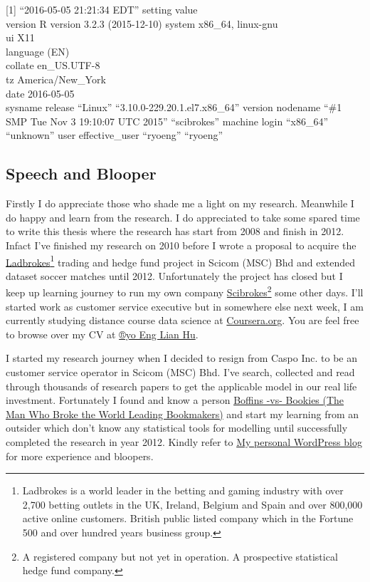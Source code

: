 \documentclass[article]{jss}
\begin{document}
{[}1{]} ``2016-05-05 21:21:34 EDT'' setting value\\
 version R version 3.2.3 (2015-12-10) system x86\_64, linux-gnu\\
 ui X11\\
 language (EN)\\
 collate en\_US.UTF-8\\
 tz America/New\_York\\
 date 2016-05-05\\
 sysname release ``Linux'' ``3.10.0-229.20.1.el7.x86\_64'' version
nodename ``\#1 SMP Tue Nov 3 19:10:07 UTC 2015'' ``scibrokes'' machine
login ``x86\_64'' ``unknown'' user effective\_user ``ryoeng'' ``ryoeng''

\subsection{Speech and Blooper}\label{speech-and-blooper}

Firstly I do appreciate those who shade me a light on my research.
Meanwhile I do happy and learn from the research. I do appreciated to
take some spared time to write this thesis where the research has start
from 2008 and finish in 2012. Infact I've finished my research on 2010
before I wrote a proposal to acquire the
\href{http://www.ladbrokesplc.com/}{Ladbrokes}\footnote{Ladbrokes is a
  world leader in the betting and gaming industry with over 2,700
  betting outlets in the UK, Ireland, Belgium and Spain and over 800,000
  active online customers. British public listed company which in the
  Fortune 500 and over hundred years business group.} trading and hedge
fund project in Scicom (MSC) Bhd and extended dataset soccer matches
until 2012. Unfortunately the project has closed but I keep up learning
journey to run my own company
\href{https://github.com/scibrokes/owner}{Scibrokes}\footnote{A
  registered company but not yet in operation. A prospective statistical
  hedge fund company.} some other days. I'll started work as customer
service executive but in somewhere else next week, I am currently
studying distance course data science at
\href{http://www.coursera.org}{Coursera.org}. You are feel free to
browse over my CV at
\href{https://beta.rstudioconnect.com/englianhu/ryo-eng/}{®yo Eng Lian
Hu}. \bigbreak

I started my research journey when I decided to resign from Caspo Inc.
to be an customer service operator in Scicom (MSC) Bhd. I've search,
collected and read through thousands of research papers to get the
applicable model in our real life investment. Fortunately I found and
know a person
\href{https://englianhu.wordpress.com/sportsbook/boffins-vs-bookies-the-man-who-broke-the-world-leading-bookmakers/}{Boffins
-vs- Bookies (The Man Who Broke the World Leading Bookmakers)} and start
my learning from an outsider which don't know any statistical tools for
modelling until successfully completed the research in year 2012. Kindly
refer to \href{https://englianhu.wordpress.com/}{My personal WordPress
blog} for more experience and bloopers. \bigbreak
\end{document}
